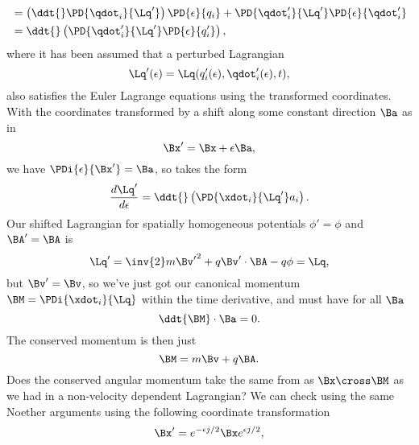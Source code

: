 {\begin{equation}
\begin{aligned}
&= \left( \ddt{} \PD{\qdot_i}{\Lq'} \right) \PD{\epsilon}{q_i} +\PD{\qdot_i'}{\Lq'} \PD{\epsilon}{\qdot_i'} \\
&= \ddt{} \left( \PD{\qdot_i'}{\Lq'} \PD{\epsilon}{q_i'} \right),
\end{aligned}
\end{equation}
%
where it has been assumed that a perturbed Lagrangian
\begin{equation}\label{eqn:classicalMechanicsPs2:610a}
\Lq'(\epsilon) = \Lq(q_i'(\epsilon), \qdot_i'(\epsilon), t),
\end{equation}
also satisfies the Euler Lagrange equations using the transformed coordinates.
With the coordinates transformed by a shift along some constant direction \(\Ba\) as in
%
\begin{equation}\label{eqn:classicalMechanicsPs2:630}
\Bx' = \Bx + \epsilon \Ba,
\end{equation}
%
we have \(\PDi{\epsilon}{\Bx'} = \Ba\), so  takes the form
%
\begin{equation}\label{eqn:classicalMechanicsPs2:650}
\frac{d\Lq'}{d\epsilon} = \ddt{} \left( \PD{\xdot_i}{\Lq'} a_i \right).
\end{equation}
%
Our shifted Lagrangian for spatially homogeneous potentials \(\phi' = \phi\) and \(\BA' = \BA\) is
%
\begin{equation}\label{eqn:classicalMechanicsPs2:670}
\Lq' = \inv{2} m {\Bv'}^2 + q \Bv' \cdot \BA - q \phi = \Lq,
\end{equation}
%
but \(\Bv' = \Bv\), so we've just got our canonical momentum \(\BM = \PDi{\xdot_i}{\Lq}\) within the time derivative, and must have for all \(\Ba\)
%
\begin{equation}\label{eqn:classicalMechanicsPs2:690}
\ddt{ \BM } \cdot \Ba = 0.
\end{equation}
%
The conserved momentum is then just
%
\begin{equation}\label{eqn:classicalMechanicsPs2:710}
\BM = m \Bv + q \BA.
\end{equation}
%
%
Does the conserved angular momentum take the same from as \(\Bx \cross \BM\) as we had in a non-velocity dependent Lagrangian?  We can check using the same Noether arguments using the following coordinate transformation
%
\begin{equation}\label{eqn:classicalMechanicsPs2:730}
\Bx' = e^{-\epsilon j/2} \Bx e^{\epsilon j/2},
\end{equation}
}
